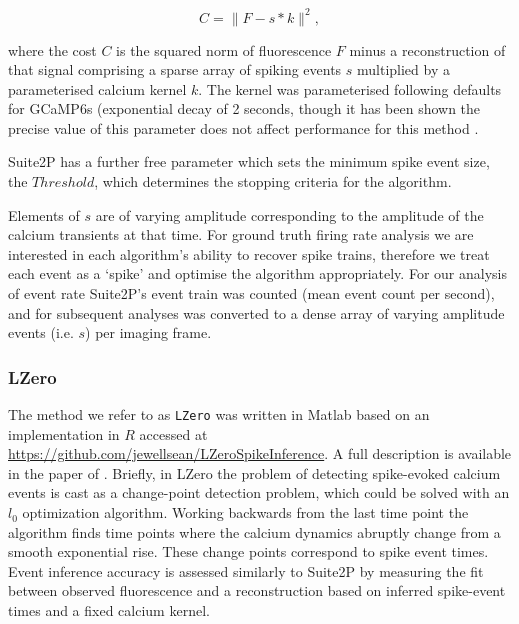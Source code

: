 \documentclass[a4paper,11pt]{article}
\begin{document}
\[C = \|F - s*k\|^2,\]

where the cost $C$ is the squared norm of fluorescence $F$ minus a reconstruction of that signal comprising a sparse array of spiking events $s$ multiplied by a parameterised calcium kernel $k$. The kernel was parameterised following defaults for GCaMP6s (exponential decay of 2 seconds, though it has been shown the precise value of this parameter does not affect performance for this method \citep{Pachitariu2018-cj}. 

Suite2P has a further free parameter which sets the minimum spike event size, the $Threshold$, which determines the stopping criteria for the algorithm.

Elements of $s$ are of varying amplitude corresponding to the amplitude of the calcium transients at that time.  For ground truth firing rate analysis we are interested in each algorithm's ability to recover spike trains, therefore we treat each event as a `spike' and optimise the algorithm appropriately. For our analysis of event rate Suite2P's event train was counted (mean event count per second), and for subsequent analyses was converted to a dense array of varying amplitude events (i.e. $s$) per imaging frame.

%



\subsubsection*{LZero}
The method we refer to as \texttt{LZero} was written in Matlab based on an implementation in $R$ accessed at \href{https://github.com/jewellsean/LZeroSpikeInference}{https://github.com/jewellsean/LZeroSpikeInference}. A full description is available in the paper of \citet{Jewell2018-cx}. Briefly, in LZero the problem of detecting spike-evoked calcium events is cast as a change-point detection problem, which could be solved with an $l_{0}$ optimization algorithm. Working backwards from the last time point the algorithm finds time points where the calcium dynamics abruptly change from a smooth exponential rise. These change points correspond to spike event times. Event inference accuracy is assessed similarly to Suite2P by measuring the fit between observed fluorescence and a reconstruction based on inferred spike-event times and a fixed calcium kernel. 
\end{document}
